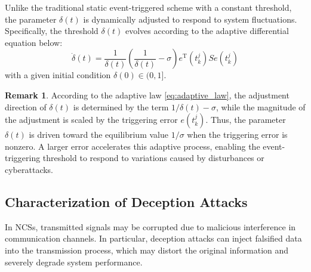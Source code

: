 \documentclass[preprint,review,fleqn,sort&compress,3p]{elsarticle}
\theoremstyle{definition} %
\theoremstyle{definition}%
\newtheorem{rem}{Remark}[section]
\newif\ifreviewmarkup
\DeclareRobustCommand{\revdel}[1]{\ifreviewmarkup{\color{revisionred}\hypersetup{linkcolor=revisionred,citecolor=revisionred}#1}\fi}
\DeclareRobustCommand{\revadd}[1]{{\ifreviewmarkup\color{revisiongreen}\hypersetup{linkcolor=revisiongreen,citecolor=revisiongreen}\fi#1}}
\begin{document}
Unlike the traditional static event-triggered scheme with a constant threshold, the parameter $\delta(t)$ is dynamically adjusted to respond to system fluctuations. Specifically, the threshold $\delta(t)$ evolves according to the adaptive differential equation below:
\begin{equation} \label{eq:adaptive_law}
	\dot{\delta}(t) = \frac{1}{\delta(t)} \left( \frac{1}{\delta(t)} - \sigma \right) e^{\mathrm{T}}(t^j_{k}) S e(t^j_{k})
\end{equation}
\label{rev:M17}with a given initial condition $\delta(0) \in (0, 1]$. \revdel{Here, $\sigma>0$ governs the convergence speed of $\delta(t)$.}

\begin{rem}
\label{rev:M18}	According to the adaptive law \eqref{eq:adaptive_law}, the adjustment direction of $\delta(t)$ is determined by the term $1/\delta(t)-\sigma$, while the magnitude of the adjustment is scaled by the triggering error $e(t^j_k)$. Thus, the parameter $\delta(t)$ is driven toward the equilibrium value $1/\sigma$ when the triggering error is nonzero. A larger error accelerates this adaptive process, enabling the event-triggering threshold to respond to variations caused by disturbances or cyberattacks. \revdel{When the triggering error is small, the update of $\delta(t)$ is weakened, thereby avoiding unnecessary fluctuations of the threshold and reducing redundant data transmissions.}
\end{rem}

\subsection{Characterization of Deception Attacks}\label{sec2.3}
In NCSs, transmitted signals may be corrupted due to malicious interference in communication channels. In particular, deception attacks can inject falsified data into the transmission process, which may distort the original information and severely degrade system performance.
\end{document}
